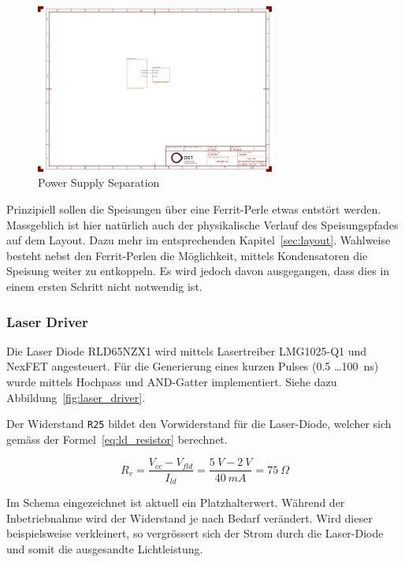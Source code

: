 \begin{figure}[H]
    \centering
    \includegraphics[page=2, trim=260 90 640 550, clip, width=0.7\textwidth]{attachments/schematic.pdf}
    \caption{Power Supply Separation}\label{fig:power_supply_separation}
\end{figure}

Prinzipiell sollen die Speisungen über eine Ferrit-Perle etwas entstört werden. Massgeblich ist hier natürlich auch der
physikalische Verlauf des Speisungspfades auf dem Layout. Dazu mehr im entsprechenden Kapitel~\ref{sec:layout}. Wahlweise
besteht nebst den Ferrit-Perlen die Möglichkeit, mittels Kondensatoren die Speisung weiter zu entkoppeln. Es wird jedoch
davon ausgegangen, dass dies in einem ersten Schritt nicht notwendig ist.

\subsubsection{Laser Driver}

Die Laser Diode RLD65NZX1 \cite{rohm2019rld65nzx1_datasheet} wird mittels Lasertreiber LMG1025-Q1 \cite{ti2024lmg1025q1_datasheet}
und NexFET \cite{ti2016csd17578q3a_datasheet} angesteuert. Für die Generierung eines kurzen Pulses (0.5 \dots 100~ns)
wurde mittels Hochpass und AND-Gatter \cite{diodes202074lvc1g08q_datasheet} implementiert. Siehe dazu Abbildung~\ref{fig:laser_driver}.

Der Widerstand \lstinline|R25| bildet den Vorwiderstand für die Laser-Diode, welcher sich gemäss der Formel~\ref{eq:ld_resistor} berechnet.

\begin{equation}\label{eq:ld_resistor}
    R_{v} = \frac{V_{cc} - V_{fld}}{I_{ld}} = \frac{5~V - 2~V}{40~mA} = 75~\Omega
\end{equation}

Im Schema eingezeichnet ist aktuell ein Platzhalterwert. Während der Inbetriebnahme wird der Widerstand je nach Bedarf
verändert. Wird dieser beispielsweise verkleinert, so vergrössert sich der Strom durch die Laser-Diode und somit die ausgesandte
Lichtleistung.

